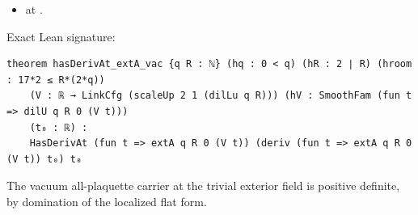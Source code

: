 \begin{theorem}[bp-098]
\begin{itemize}
\item \texttt{} at \texttt{}.
\end{itemize}
\par Exact Lean signature:
\begin{verbatim}
theorem hasDerivAt_extA_vac {q R : ℕ} (hq : 0 < q) (hR : 2 ∣ R) (hroom : 17*2 ≤ R*(2*q))
    (V : ℝ → LinkCfg (scaleUp 2 1 (dilLu q R))) (hV : SmoothFam (fun t => dilU q R 0 (V t)))
    (t₀ : ℝ) :
    HasDerivAt (fun t => extA q R 0 (V t)) (deriv (fun t => extA q R 0 (V t)) t₀) t₀
\end{verbatim}
\end{theorem}

\begin{theorem}[bp-099]
\label{bp-099}
\uses{}
\leanok
The vacuum all-plaquette carrier at the trivial exterior field is positive definite, by domination of the localized flat form.


\end{theorem}
